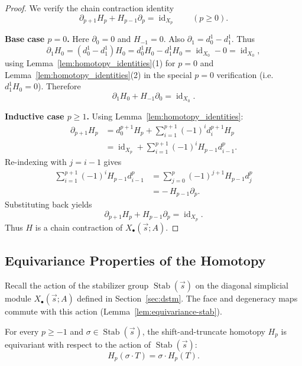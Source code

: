 \begin{proof}
We verify the chain contraction identity
\[
\partial_{p+1} H_p + H_{p-1} \partial_p = \operatorname{id}_{X_p}
\qquad(p\ge 0).
\]

\textbf{Base case $p=0$.}
Here $\partial_0=0$ and $H_{-1}=0$. Also $\partial_1 = d_0^1 - d_1^1$. Thus
\[
\partial_1 H_0
= (d_0^1 - d_1^1)H_0
= d_0^1 H_0 - d_1^1 H_0
= \operatorname{id}_{X_0} - 0
= \operatorname{id}_{X_0},
\]
using Lemma~\ref{lem:homotopy_identities}(1) for $p=0$ and Lemma~\ref{lem:homotopy_identities}(2) in the special $p=0$ verification (i.e.\ $d_1^1 H_0=0$).
Therefore
\[
\partial_1 H_0 + H_{-1}\partial_0 = \operatorname{id}_{X_0}.
\]

\textbf{Inductive case $p\ge 1$.}
Using Lemma~\ref{lem:homotopy_identities}:
\begin{align*}
\partial_{p+1} H_p
&= d_0^{p+1} H_p + \sum_{i=1}^{p+1} (-1)^i d_i^{p+1} H_p \\
&= \operatorname{id}_{X_p} + \sum_{i=1}^{p+1} (-1)^i H_{p-1} d_{i-1}^p.
\end{align*}
Re-indexing with $j=i-1$ gives
\begin{align*}
\sum_{i=1}^{p+1} (-1)^i H_{p-1} d_{i-1}^p
&= \sum_{j=0}^{p} (-1)^{j+1} H_{p-1} d_j^p \\
&= -\,H_{p-1}\partial_p.
\end{align*}
Substituting back yields
\[
\partial_{p+1} H_p + H_{p-1}\partial_p = \operatorname{id}_{X_p}.
\]
Thus $H$ is a chain contraction of $X_\bullet(\vec s;A)$.
\end{proof}



\subsection{Equivariance Properties of the Homotopy}

Recall the action of the stabilizer group $\operatorname{Stab}(\vec{s})$ on the diagonal simplicial module $X_\bullet(\vec{s};A)$ defined in Section~\ref{sec:dstm}. 
The face and degeneracy maps commute with this action (Lemma~\ref{lem:equivariance-stab}).

\begin{lemma}\label{lem:homotopy_equivariance}
For every $p\ge -1$ and $\sigma\in \operatorname{Stab}(\vec{s})$, the shift-and-truncate homotopy $H_p$ is equivariant with respect to the action of $\operatorname{Stab}(\vec{s})$:
\[
H_p(\sigma\cdot T)=\sigma\cdot H_p(T).
\]
\end{lemma}

